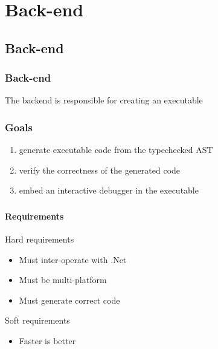 \section{Back-end}

\subsection{Back-end}
\begin{frame}
    \frametitle{Back-end}
    The backend is responsible for creating an executable
\end{frame}

\begin{frame}
    \frametitle{Goals}
    \begin{enumerate}
    \item generate executable code from the typechecked AST
    \item verify the correctness of the generated code
    \item embed an interactive debugger in the executable
    \end{enumerate}
\end{frame}

\begin{frame}
    \frametitle{\subsecname}
    \framesubtitle{Requirements}
    Hard requirements
    \begin{itemize}
    \item Must inter-operate with .Net
    \item Must be multi-platform
    \item Must generate correct code
    \end{itemize}
    Soft requirements
    \begin{itemize}
    \item Faster is better
    \end{itemize}
\end{frame}

